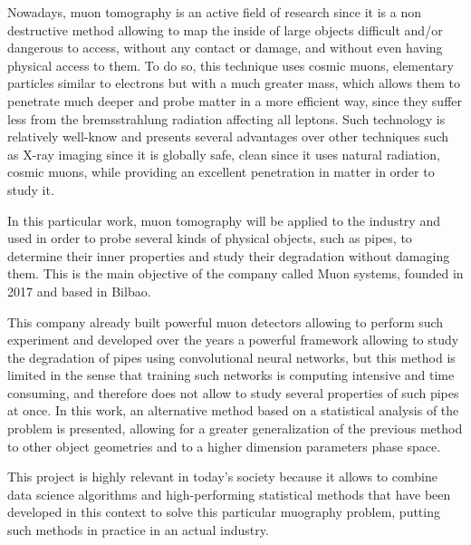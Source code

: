 \documentclass[a4paper, 11pt]{report}
\begin{document}
Nowadays, muon tomography is an active field of research since it is a non destructive method allowing to map the inside of large objects difficult and/or dangerous to access, without any contact or damage, and without even having physical access to them. To do so, this technique uses cosmic muons, elementary particles similar to electrons but with a much greater mass, which allows them to penetrate much deeper and probe matter in a more efficient way, since they suffer less from the bremsstrahlung radiation affecting all leptons. Such technology is relatively well-know and presents several advantages over other techniques such as X-ray imaging since it is globally safe, clean since it uses natural radiation, cosmic muons, while providing an excellent penetration in matter in order to study it.

In this particular work, muon tomography will be applied to the industry and used in order to probe several kinds of physical objects, such as pipes, to determine their inner properties and study their degradation without damaging them. This is the main objective of the company called Muon systems, founded in 2017 and based in Bilbao.

This company already built powerful muon detectors allowing to perform such experiment and developed over the years a powerful framework allowing to study the degradation of pipes using convolutional neural networks, but this method is limited in the sense that training such networks is computing intensive and time consuming, and therefore does not allow to study several properties of such pipes at once. In this work, an alternative method based on a statistical analysis of the problem is presented, allowing for a greater generalization of the previous method to other object geometries and to a higher dimension parameters phase space.

This project is highly relevant in today's society because it allows to combine data science algorithms and high-performing statistical methods that have been developed in this context to solve this particular muography problem, putting such methods in practice in an actual industry.
\end{document}
